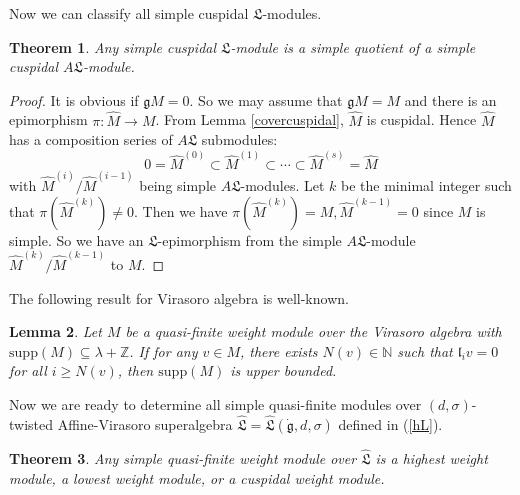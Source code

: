 \documentclass[1p]{elsarticle}
\numberwithin{equation}{section}
\def\dg{\dot{\mathfrak{g}}}
\def\fg{\mathfrak{g}}
\def\fL{\mathfrak{L}}
\def\bN{\mathbb{N}}
\def\bZ{\mathbb{Z}}
\def\fl{\mathfrak{l}}
\def\hL{\hat{\fL}}
\newtheorem{theo}{{Theorem}}%
\newtheorem{lemm}[theo]{Lemma}
\begin{document}
Now we can classify all simple cuspidal $\fL$-modules.
\begin{theo}\label{cuspidal} Any simple cuspidal $\fL$-module is a simple quotient of a simple cuspidal $A\fL$-module.

\end{theo}
\begin{proof} It is obvious if $\fg M=0$. So we may assume that $\fg M=M$ and there is an epimorphism $\pi: \widehat{M}\to M$. From Lemma \ref{covercuspidal}, $\widehat{M}$ is cuspidal. Hence $\widehat{M}$ has a composition series of $A\fL$ submodules:
\[
0=\widehat{M}^{(0)}\subset\widehat{M}^{(1)}\subset\cdots\subset\widehat{M}^{(s)}=\widehat{M}
\]
with $\widehat{M}^{(i)}/\widehat{M}^{(i-1)}$ being simple $A\fL$-modules. Let $k$ be the minimal integer such that $\pi(\widehat{M}^{(k)})\neq0$. Then we have $\pi(\widehat{M}^{(k)})=M, \widehat{M}^{(k-1)}=0$ since $M$ is simple. So we have an $\fL$-epimorphism from the simple $A\fL$-module $\widehat{M}^{(k)}/\widehat{M}^{(k-1)}$ to $M$.
\end{proof}





The following result for Virasoro algebra is well-known.

\begin{lemm}\label{weightupper}
Let $M$ be a   quasi-finite weight module over the Virasoro algebra with $\mathrm{supp}(M)\subseteq\lambda+\bZ$. If for any $v\in M$, there exists $N(v)\in\bN$ such that $\fl_iv=0$ for all $i\geq N(v)$, then $\mathrm{supp}(M)$ is upper bounded.
\end{lemm}

Now we are ready to determine all simple quasi-finite modules  over $(d,\sigma)$-twisted Affine-Virasoro superalgebra $\hL=\hL(\dg,d,\sigma)$ defined in (\ref{hL}).

\begin{theo}\label{noncuspidal}Any simple  quasi-finite weight module over $\hL$ is a highest weight module, a lowest weight module, or a cuspidal weight module. \end{theo}
\end{document}
